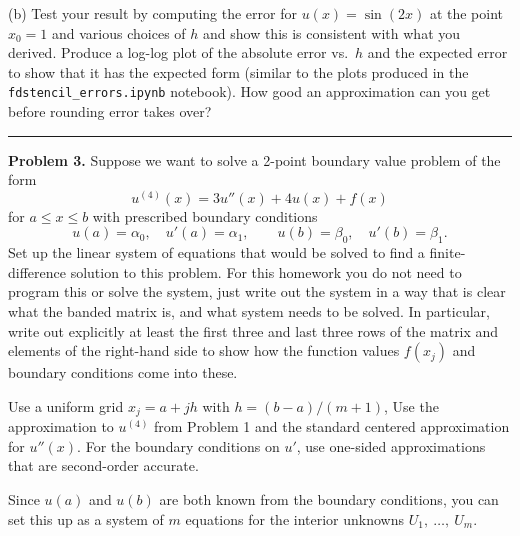 \documentclass[10pt]{article}
\begin{document}
(b) Test your result by computing the error for $u(x) = \sin(2x)$
at the point $x_0 = 1$ and various choices of $h$ and show this is
consistent with what you derived.  Produce a log-log plot of the absolute
error vs.\ $h$ and the expected error to show that it has the expected form 
(similar to the plots produced in the {\tt fdstencil\_errors.ipynb} notebook).
How good an approximation can you get before rounding error takes over?




\vskip 1cm
\hrule
{\bf Problem 3.}
Suppose we want to solve a 2-point boundary value problem of the form
\[
u^{(4)}(x) = 3u''(x) + 4u(x) + f(x)
\]
for $a \leq x \leq b$ with prescribed boundary conditions 
\[
u(a) = \alpha_0, \quad u'(a) = \alpha_1, \qquad
u(b) = \beta_0, \quad u'(b) = \beta_1.
\]
Set up the linear system of equations that would be solved to find a
finite-difference solution to this problem.  For this homework you do not
need to program this or solve the system, just write out the system in
a way that is clear what the banded matrix is, and what system needs to be
solved. In particular, write
out explicitly at least the first three and last three rows of the matrix
and elements of the right-hand side to show how the function values $f(x_j)$
and boundary conditions come into these.

Use a uniform grid $x_j = a + jh$ with $h = (b-a)/(m+1)$, 
Use the approximation to $u^{(4)}$ from Problem 1 and the standard centered
approximation for $u''(x)$.  For the boundary conditions on $u'$, use 
one-sided approximations that are second-order accurate.

Since $u(a)$ and $u(b)$ are both known from the boundary conditions, you can
set this up as a system of $m$ equations for the interior unknowns $U_1,~
\ldots,~ U_m$.  





\end{document}
